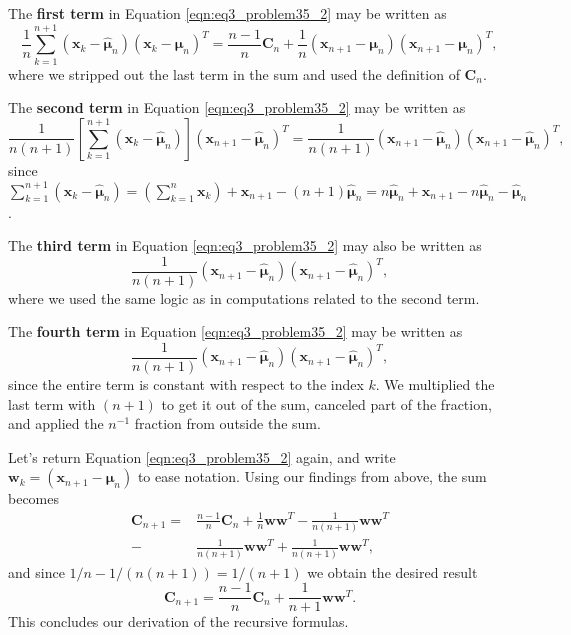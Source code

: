 \documentclass[12pt, a4paper]{article}
\newcommand{\vect}[1]{\bm{#1}}
\begin{document}
\begin{easylist}[enumerate]
The \textbf{first term} in Equation \eqref{eqn:eq3_problem35_2} may be written as
\begin{equation*}
	\frac{1}{n} \sum_{k=1}^{n+1}  \left( \vect{x}_k  - \hat{\vect{\mu}}_n \right)\left( \vect{x}_k  - \hat{\vect{\mu}}_n \right)^T = \frac{n-1}{n} \vect{C}_n  
	+ \frac{1}{n} \left( \vect{x}_{n+1} - \vect{\mu}_n \right) 
	\left( \vect{x}_{n+1} - \vect{\mu}_n \right)^T,
\end{equation*}
where we stripped out the last term in the sum and used the definition of $\vect{C}_n$.


The \textbf{second term} in Equation \eqref{eqn:eq3_problem35_2} may be written as
\begin{equation*}
\frac{1}{n(n+1)} \left[ \sum_{k=1}^{n+1}  \left( \vect{x}_{k}  - \hat{\vect{\mu}}_n \right)\right]\left( \vect{x}_{n+1} - \hat{\vect{\mu}}_n \right)^T
= 
\frac{1}{n(n+1)}  
\left( \vect{x}_{n+1} - \hat{\vect{\mu}}_n \right)
\left( \vect{x}_{n+1} - \hat{\vect{\mu}}_n \right)^T,
\end{equation*}
since $\sum_{k=1}^{n+1}  \left( \vect{x}_{k}  - \hat{\vect{\mu}}_n \right)
= \left( \sum_{k=1}^{n} \vect{x}_{k} \right) + \vect{x}_{n+1} - (n+1)\hat{\vect{\mu}}_n = n\hat{\vect{\mu}}_n + \vect{x}_{n+1} - n\hat{\vect{\mu}}_n - \hat{\vect{\mu}}_n$.

The \textbf{third term} in Equation \eqref{eqn:eq3_problem35_2} may also be written as
\begin{equation*}
\frac{1}{n(n+1)}  
\left( \vect{x}_{n+1} - \hat{\vect{\mu}}_n \right)
\left( \vect{x}_{n+1} - \hat{\vect{\mu}}_n \right)^T,
\end{equation*}
where we used the same logic as in computations related to the second term.

The \textbf{fourth term} in Equation \eqref{eqn:eq3_problem35_2} may be written as
\begin{equation*}
\frac{1}{n(n+1)}  
\left( \vect{x}_{n+1} - \hat{\vect{\mu}}_n \right)
\left( \vect{x}_{n+1} - \hat{\vect{\mu}}_n \right)^T,
\end{equation*}
since the entire term is constant with respect to the index $k$.
We multiplied the last term with $(n+1)$ to get it out of the sum, canceled part of the fraction, and applied the $n^{-1}$ fraction from outside the sum.

Let's return Equation \eqref{eqn:eq3_problem35_2} again, and write $\vect{w}_k = \left( \vect{x}_{n+1} - \hat{\vect{\mu}}_n \right)$ to ease notation.
Using our findings from above, the sum becomes
\begin{align*}
\vect{C}_{n+1} = & \frac{n-1}{n} \vect{C}_n +  \frac{1}{n} \vect{w} \vect{w}^T -  \frac{1}{n(n+1)} \vect{w} \vect{w}^T \\
- &  \frac{1}{n(n+1)} \vect{w} \vect{w}^T + \frac{1}{n(n+1)} \vect{w} \vect{w}^T,
\end{align*}
and since $1/n - 1/(n (n+1)) = 1 / ( n + 1 )$ we obtain the desired result
\begin{equation*}
	\vect{C}_{n+1} = \frac{n-1}{n} \vect{C}_n + \frac{1}{n+1} \vect{w} \vect{w}^T.
\end{equation*}
This concludes our derivation of the recursive formulas.



\end{easylist}
\end{document}
